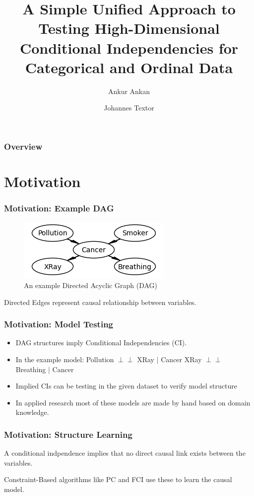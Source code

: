 \documentclass{beamer}
\def\ci{\perp\!\!\!\!\!\perp}
\begin{document}
\title{A Simple Unified Approach to Testing High-Dimensional Conditional
Independencies for Categorical and Ordinal Data}
\author {Ankur Ankan \and Johannes Textor}
\date{}
\maketitle

\begin{frame}
	\frametitle{Overview}
	\tableofcontents
\end{frame}

\section{Motivation}
\begin{frame}
	\frametitle{Motivation: Example DAG}
	\begin{figure}
		\centering
		\includegraphics[scale=0.6]{imgs/example_dag.png}
		\caption*{An example Directed Acyclic Graph (DAG)}
	\end{figure}

	Directed Edges represent causal relationship between variables.

\end{frame}

\begin{frame}
	\frametitle{Motivation: Model Testing}
	\begin{itemize}
		\item DAG structures imply Conditional Independencies (CI).
		\item In the example model:
			Pollution $ \ci $ XRay $ | $ Cancer
			XRay $ \ci $ Breathing $ | $ Cancer

		\item Implied CIs can be testing in the given dataset to verify
			model structure
		\item In applied research most of these models are made by hand
			based on domain knowledge.
	\end{itemize}
\end{frame}

\begin{frame}
	\frametitle{Motivation: Structure Learning}

	A conditional indpendence implies that no direct causal link exists between the 
	variables.

	Constraint-Based algorithms like PC and FCI use these to learn the causal
	model.
\end{frame}
\end{document}
